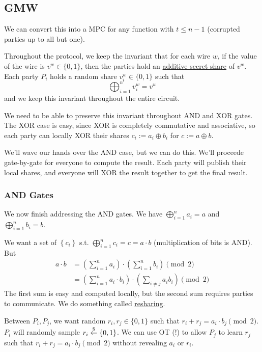 \subsection{GMW}

We can convert this into a MPC for any function with $t \leq n - 1$ (corrupted parties up to all but one).

Throughout the protocol, we keep the invariant that for each wire $w$, if the value of the wire is $v^w \in\{0, 1\}$, then the parties hold an \ul{additive secret share} of $v^w$. Each party $P_i$ holds a random share $v_i^w\in\{0,1\}$ such that
\[\bigoplus_{i=1}^n v_i^w = v^w\]
and we keep this invariant throughout the entire circuit.

We need to be able to preserve this invariant throughout \textsf{AND} and \textsf{XOR} gates. The \textsf{XOR} case is easy, since \textsf{XOR} is completely commutative and associative, so each party can locally \textsf{XOR} their shares $c_i := a_i\oplus b_i$ for $c := a\oplus b$.

We'll wave our hands over the \textsf{AND} case, but we can do this. We'll proceede gate-by-gate for everyone to compute the result. Each party will publish their local shares, and everyone will \textsf{XOR} the result together to get the final result.

\subsubsection{AND Gates}
We now finish addressing the \textsf{AND} gates. We have $\bigoplus^n_{i=1}a_i = a$ and $\bigoplus^n_{i=1}b_i = b$.

We want a set of $\left\{ c_i \right\}$ s.t. $\bigoplus^n_{i=1}c_i = c = a \cdot b$ (multiplication of bits is \textsf{AND}). But
\begin{align*}
    a\cdot b
     & = \left( \sum^n_{i=1}a_i \right)\cdot \left( \sum^n_{i=1}b_i \right)\pmod{2}                \\
     & = \left( \sum^n_{i=1}a_i\cdot b_i \right)\cdot \left( \sum_{i\neq j}a_i b_i \right)\pmod{2}
\end{align*}
The first sum is easy and computed locally, but the second sum requires parties to communicate. We do something called \ul{resharing}.


Between $P_i, P_j$, we want random $r_i, r_j\in\{0, 1\}$ such that $r_i + r_j = a_i \cdot b_j \pmod{2}$. $P_i$ will randomly sample $r_i\overset{\$}{\leftarrow} \left\{ 0, 1 \right\}$. We can use OT (!) to allow $P_j$ to learn $r_j$ such that $r_i + r_j = a_i\cdot b_j\pmod{2}$ without revealing $a_i$ or $r_i$.

